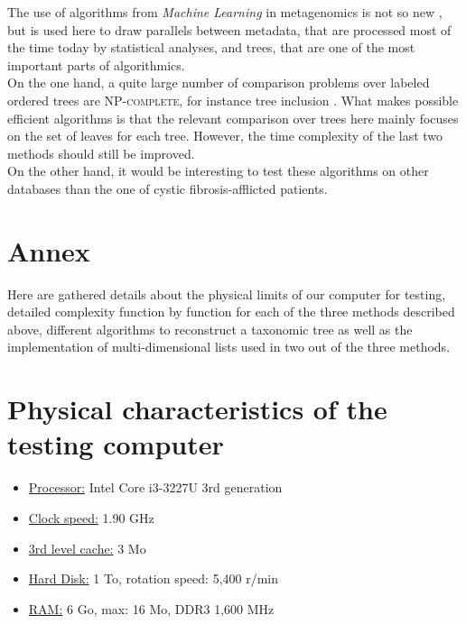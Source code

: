 \documentclass{report}
\begin{document}
The use of algorithms from \emph{Machine Learning} in metagenomics is not so new \cite{Nikolski}, but is used here to draw parallels between metadata, that are processed most of the time today by statistical analyses, and trees, that are one of the most important parts of algorithmics.\\

On the one hand, a quite large number of comparison problems over labeled ordered trees are \textsc{NP-complete}, for instance tree inclusion \cite{TreeInclusion}. What makes possible efficient algorithms is that the relevant comparison over trees here mainly focuses on the set of leaves for each tree. However, the time complexity of the last two methods should still be improved.\\

On the other hand, it would be interesting to test these algorithms on other databases than the one of cystic fibrosis-afflicted patients.

\newpage




\newpage

\appendix

\chapter*{Annex}

Here are gathered details about the physical limits of our computer for testing, detailed complexity function by function for each of the three methods described above, different algorithms to reconstruct a taxonomic tree as well as the implementation of multi-dimensional lists used in two out of the three methods.

\chapter{Physical characteristics of the testing computer}

\begin{itemize}
\item \uline{Processor:} Intel Core i3-3227U 3rd generation
\item \uline{Clock speed:} 1.90 GHz
\item \uline{3rd level cache:} 3 Mo
\item \uline{Hard Disk:} 1 To, rotation speed: 5,400 r/min
\item \uline{RAM:} 6 Go, max: 16 Mo, DDR3 1,600 MHz
\end{itemize}
\end{document}
